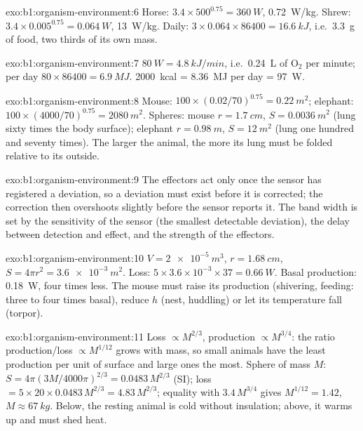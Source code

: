 \begin{solution}{exo:b1:organism-environment:6}
Horse: $3.4\times 500^{0.75} = \qty{360}{W}$, \qty{0.72}{W/kg}. Shrew:
$3.4\times 0.005^{0.75} = \qty{0.064}{W}$, \qty{13}{W/kg}. Daily:
$3\times 0.064\times 86400 = \qty{16.6}{kJ}$, i.e.\ \qty{3.3}{g} of food,
two thirds of its own mass.
\end{solution}

\begin{solution}{exo:b1:organism-environment:7}
$\qty{80}{W} = \qty{4.8}{kJ/min}$, i.e.\ \qty{0.24}{L} of $\mathrm{O_2}$
per minute; per day $80\times 86400 = \qty{6.9}{MJ}$. \qty{2000}{kcal}
= \qty{8.36}{MJ} per day = \qty{97}{W}.
\end{solution}

\begin{solution}{exo:b1:organism-environment:8}
Mouse: $100\times(0.02/70)^{0.75} = \qty{0.22}{m^2}$; elephant:
$100\times(4000/70)^{0.75} = \qty{2080}{m^2}$. Spheres: mouse
$r = \qty{1.7}{cm}$, $S = \qty{0.0036}{m^2}$ (lung sixty times the
body surface); elephant $r = \qty{0.98}{m}$, $S = \qty{12}{m^2}$ (lung
one hundred and seventy times). The larger the animal, the more its lung
must be folded relative to its outside.
\end{solution}

\begin{solution}{exo:b1:organism-environment:9}
The effectors act only once the sensor has registered a deviation, so a
deviation must exist before it is corrected; the correction then
overshoots slightly before the sensor reports it. The band width is set
by the sensitivity of the sensor (the smallest detectable deviation),
the delay between detection and effect, and the strength of the
effectors.
\end{solution}

\begin{solution}{exo:b1:organism-environment:10}
$V = \qty{2e-5}{m^3}$, $r = \qty{1.68}{cm}$, $S = 4\pi r^2 =
\qty{3.6e-3}{m^2}$. Loss: $5\times 3.6\times 10^{-3}\times 37 =
\qty{0.66}{W}$. Basal production: \qty{0.18}{W}, four times less. The
mouse must raise its production (shivering, feeding: three to four times
basal), reduce $h$ (nest, huddling) or let its temperature fall (torpor).
\end{solution}

\begin{solution}{exo:b1:organism-environment:11}
Loss $\propto M^{2/3}$, production $\propto M^{3/4}$: the ratio
production/loss $\propto M^{1/12}$ grows with mass, so small animals have
the least production per unit of surface and large ones the most. Sphere
of mass $M$: $S = 4\pi(3M/4000\pi)^{2/3} = \num{0.0483}\,M^{2/3}$ (SI);
loss $= 5\times 20\times 0.0483\,M^{2/3} = 4.83\,M^{2/3}$; equality with
$3.4\,M^{3/4}$ gives $M^{1/12} = 1.42$, $M \approx \qty{67}{kg}$. Below,
the resting animal is cold without insulation; above, it warms up and
must shed heat.
\end{solution}


